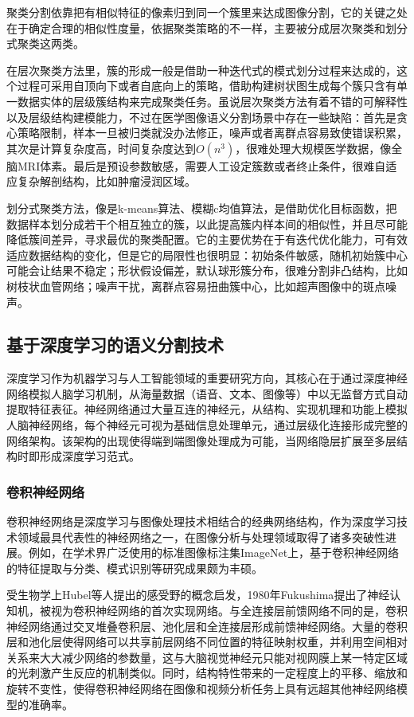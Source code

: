 聚类分割依靠把有相似特征的像素归到同一个簇里来达成图像分割，它的关键之处在于确定合理的相似性度量，依据聚类策略的不一样，主要被分成层次聚类和划分式聚类这两类。

在层次聚类方法里，簇的形成一般是借助一种迭代式的模式划分过程来达成的，这个过程可采用自顶向下或者自底向上的策略，借助构建树状图生成每个簇只含有单一数据实体的层级簇结构来完成聚类任务。虽说层次聚类方法有着不错的可解释性以及层级结构建模能力，不过在医学图像语义分割场景中存在一些缺陷：首先是贪心策略限制，样本一旦被归类就没办法修正，噪声或者离群点容易致使错误积累，其次是计算复杂度高，时间复杂度达到$O(n^3)$，很难处理大规模医学数据，像全脑MRI体素。最后是预设参数敏感，需要人工设定簇数或者终止条件，很难自适应复杂解剖结构，比如肿瘤浸润区域。

划分式聚类方法，像是k-means算法、模糊c均值算法，是借助优化目标函数，把数据样本划分成若干个相互独立的簇，以此提高簇内样本间的相似性，并且尽可能降低簇间差异，寻求最优的聚类配置。它的主要优势在于有迭代优化能力，可有效适应数据结构的变化，但是它的局限性也很明显：初始条件敏感，随机初始簇中心可能会让结果不稳定；形状假设偏差，默认球形簇分布，很难分割非凸结构，比如树枝状血管网络；噪声干扰，离群点容易扭曲簇中心，比如超声图像中的斑点噪声。

\subsection{基于深度学习的语义分割技术}

深度学习作为机器学习与人工智能领域的重要研究方向，其核心在于通过深度神经网络模拟人脑学习机制，从海量数据（语音、文本、图像等）中以无监督方式自动提取特征表征。神经网络通过大量互连的神经元，从结构、实现机理和功能上模拟人脑神经网络，每个神经元可视为基础信息处理单元，通过层级化连接形成完整的网络架构\cite{qiu2020nndl}。该架构的出现使得端到端图像处理成为可能，当网络隐层扩展至多层结构时即形成深度学习范式。

\subsubsection{卷积神经网络}

卷积神经网络是深度学习与图像处理技术相结合的经典网络结构，作为深度学习技术领域最具代表性的神经网络之一，在图像分析与处理领域取得了诸多突破性进展。例如，在学术界广泛使用的标准图像标注集ImageNet上，基于卷积神经网络的特征提取与分类、模式识别等研究成果颇为丰硕。

受生物学上Hubel等人\cite{hubel1962}提出的感受野的概念启发，1980年Fukushima\cite{fukushima1980}提出了神经认知机，被视为卷积神经网络的首次实现网络。与全连接层前馈网络不同的是，卷积神经网络通过交叉堆叠卷积层、池化层和全连接层形成前馈神经网络。大量的卷积层和池化层使得网络可以共享前层网络不同位置的特征映射权重，并利用空间相对关系来大大减少网络的参数量，这与大脑视觉神经元只能对视网膜上某一特定区域的光刺激产生反应的机制类似。同时，结构特性带来的一定程度上的平移、缩放和旋转不变性，使得卷积神经网络在图像和视频分析任务上具有远超其他神经网络模型的准确率。

